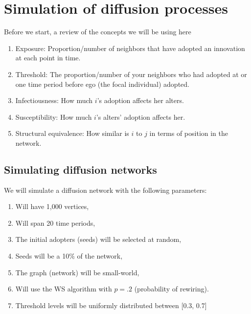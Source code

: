 \documentclass[
]{book}
\providecommand{\tightlist}{%
  \setlength{\itemsep}{0pt}\setlength{\parskip}{0pt}}
\begin{document}
\hypertarget{simulation-of-diffusion-processes}{%
\section{Simulation of diffusion processes}\label{simulation-of-diffusion-processes}}

Before we start, a review of the concepts we will be using here

\begin{enumerate}
\def\labelenumi{\arabic{enumi}.}
\tightlist
\item
  Exposure: Proportion/number of neighbors that have adopted an innovation at each point in time.
\item
  Threshold: The proportion/number of your neighbors who had adopted at or one time period before ego (the focal individual) adopted.
\item
  Infectiousness: How much \(i\)'s adoption affects her alters.
\item
  Susceptibility: How much \(i\)'s alters' adoption affects her.
\item
  Structural equivalence: How similar is \(i\) to \(j\) in terms of position in the network.
\end{enumerate}

\hypertarget{simulating-diffusion-networks}{%
\subsection{Simulating diffusion networks}\label{simulating-diffusion-networks}}

We will simulate a diffusion network with the following parameters:

\begin{enumerate}
\def\labelenumi{\arabic{enumi}.}
\tightlist
\item
  Will have 1,000 vertices,
\item
  Will span 20 time periods,
\item
  The initial adopters (seeds) will be selected at random,
\item
  Seeds will be a 10\% of the network,
\item
  The graph (network) will be small-world,
\item
  Will use the WS algorithm with \(p=.2\) (probability of rewiring).
\item
  Threshold levels will be uniformly distributed between {[}0.3, 0.7{]}
\end{enumerate}
\end{document}
